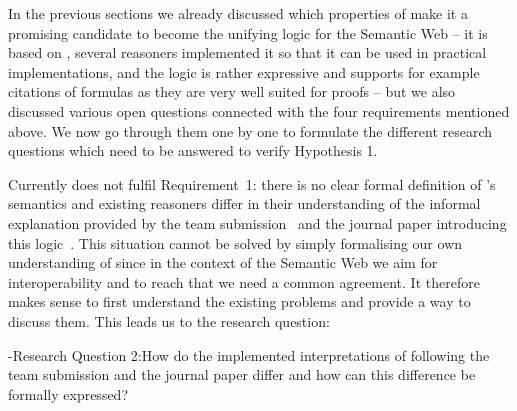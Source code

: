 In the previous sections we already discussed which properties of \nthreelogic make it a promising candidate to become the unifying logic for the Semantic Web -- 
it is based on \rdf, several reasoners implemented it so that it can be used in practical implementations, and the logic is rather expressive and supports for example citations 
of formulas as they are very well suited for proofs -- but we also discussed various open questions connected with the four requirements 
mentioned above. We now go through them one by one to formulate the different research questions which need to be answered to verify Hypothesis 1.


Currently \nthreelogic does not fulfil Requirement~1: there is no clear formal definition of \nthree's semantics and existing \nthree reasoners
differ in their understanding of the informal explanation provided by the \wwwc team submission~\cite{Notation3} and the journal paper introducing this logic~\cite{N3Logic}. 
This situation cannot be solved by simply formalising our own understanding of \nthreelogic since in the context of the Semantic Web 
we aim for interoperability and to reach that we need a 
common agreement. It therefore makes sense to first understand the existing problems and provide a way to discuss them. This leads us to the research question:

\hyp{\hypertarget{rq2}{Research Question 2:}}{How do the implemented interpretations of \nthree following the \wwwc team submission and the journal paper 
differ and how can this difference be formally expressed?}

